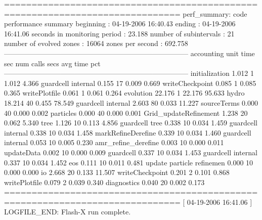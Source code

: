 \begin{codeseg}
 ==============================================================================
 perf_summary: code performance summary
                      beginning : 04-19-2006  16:40.43
                         ending : 04-19-2006  16:41.06
   seconds in monitoring period :               23.188
         number of subintervals :                   21
        number of evolved zones :                16064
               zones per second :              692.758
 ------------------------------------------------------------------------------
 accounting unit                       time sec  num calls   secs avg  time pct
 ------------------------------------------------------------------------------
 initialization                          1.012      1           1.012     4.366
  guardcell internal                     0.155     17           0.009     0.669
  writeCheckpoint                        0.085      1           0.085     0.365
  writePlotfile                          0.061      1           0.061     0.264
 evolution                              22.176      1          22.176    95.633
  hydro                                 18.214     40           0.455    78.549
   guardcell internal                    2.603     80           0.033    11.227
  sourceTerms                            0.000     40           0.000     0.002
  particles                              0.000     40           0.000     0.001
  Grid_updateRefinement                  1.238     20           0.062     5.340
   tree                                  1.126     10           0.113     4.856
    guardcell tree                       0.338     10           0.034     1.459
     guardcell internal                  0.338     10           0.034     1.458
    markRefineDerefine                   0.339     10           0.034     1.460
     guardcell internal                  0.053     10           0.005     0.230
    amr_refine_derefine                  0.003     10           0.000     0.011
    updateData                           0.002     10           0.000     0.009
    guardcell                            0.337     10           0.034     1.453
     guardcell internal                  0.337     10           0.034     1.452
   eos                                   0.111     10           0.011     0.481
   update particle refinemen             0.000     10           0.000     0.000
  io                                     2.668     20           0.133    11.507
   writeCheckpoint                       0.201      2           0.101     0.868
   writePlotfile                         0.079      2           0.039     0.340
   diagnostics                           0.040     20           0.002     0.173
 ==============================================================================
 [ 04-19-2006  16:41.06 ] LOGFILE_END: Flash-X run complete.
\end{codeseg}






